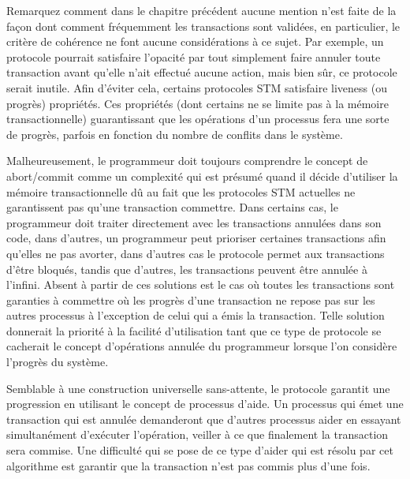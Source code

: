 Remarquez comment dans le chapitre précédent aucune mention n'est faite de la façon dont comment fréquemment les transactions sont validées, en particulier, le critère de cohérence ne font aucune considérations à ce sujet.
Par exemple, un protocole pourrait satisfaire l'opacité par tout simplement faire annuler toute transaction avant qu'elle n'ait effectué aucune action, mais bien sûr, ce protocole serait inutile.
Afin d'éviter cela, certains protocoles STM satisfaire liveness (ou progrès) propriétés.
Ces propriétés (dont certains ne se limite pas à la mémoire transactionnelle) guarantissant que les opérations d'un processus fera une sorte de progrès, parfois en fonction du nombre de conflits dans le système.






Malheureusement, le programmeur doit toujours comprendre le concept de abort/commit comme un complexité qui
est présumé quand il décide d'utiliser la mémoire transactionnelle dû au fait que les protocoles STM actuelles ne garantissent pas qu'une transaction commettre.
Dans certains cas, le programmeur doit traiter directement avec les transactions annulées dans son code,
dans d'autres, un programmeur peut prioriser certaines transactions afin qu'elles ne pas avorter, dans d'autres cas le protocole permet aux transactions d'être bloqués,
tandis que d'autres, les transactions peuvent être annulée à l'infini.
Absent à partir de ces solutions est le cas où toutes les transactions sont garanties à commettre où les
progrès d'une transaction ne repose pas sur les autres processus à l'exception de celui qui a émis la transaction.
Telle solution donnerait la priorité à la facilité d'utilisation tant que ce type de protocole se cacherait le concept d'opérations annulée du programmeur lorsque l'on considère l'progrès du système.



Semblable à une construction universelle sans-attente, le protocole garantit une progression en utilisant le concept de processus d'aide.
Un processus qui émet une transaction qui est annulée demanderont que d'autres processus aider en essayant simultanément d'exécuter l'opération, veiller à ce que finalement la transaction sera commise.
Une difficulté qui se pose de ce type d'aider qui est résolu par cet algorithme est garantir que la transaction n'est pas commis plus d'une fois.



